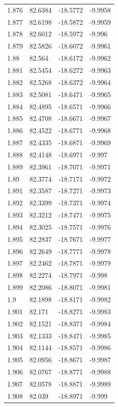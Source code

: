 \begin{tabular}{llll}
1.876 & 82.6384 & -18.5772 & -9.9958 \\
1.877 & 82.6198 & -18.5872 & -9.9959 \\
1.878 & 82.6012 & -18.5972 & -9.996 \\
1.879 & 82.5826 & -18.6072 & -9.9961 \\
1.88 & 82.564 & -18.6172 & -9.9962 \\
1.881 & 82.5454 & -18.6272 & -9.9963 \\
1.882 & 82.5268 & -18.6372 & -9.9964 \\
1.883 & 82.5081 & -18.6471 & -9.9965 \\
1.884 & 82.4895 & -18.6571 & -9.9966 \\
1.885 & 82.4708 & -18.6671 & -9.9967 \\
1.886 & 82.4522 & -18.6771 & -9.9968 \\
1.887 & 82.4335 & -18.6871 & -9.9969 \\
1.888 & 82.4148 & -18.6971 & -9.997 \\
1.889 & 82.3961 & -18.7071 & -9.9971 \\
1.89 & 82.3774 & -18.7171 & -9.9972 \\
1.891 & 82.3587 & -18.7271 & -9.9973 \\
1.892 & 82.3399 & -18.7371 & -9.9974 \\
1.893 & 82.3212 & -18.7471 & -9.9975 \\
1.894 & 82.3025 & -18.7571 & -9.9976 \\
1.895 & 82.2837 & -18.7671 & -9.9977 \\
1.896 & 82.2649 & -18.7771 & -9.9978 \\
1.897 & 82.2462 & -18.7871 & -9.9979 \\
1.898 & 82.2274 & -18.7971 & -9.998 \\
1.899 & 82.2086 & -18.8071 & -9.9981 \\
1.9 & 82.1898 & -18.8171 & -9.9982 \\
1.901 & 82.171 & -18.8271 & -9.9983 \\
1.902 & 82.1521 & -18.8371 & -9.9984 \\
1.903 & 82.1333 & -18.8471 & -9.9985 \\
1.904 & 82.1144 & -18.8571 & -9.9986 \\
1.905 & 82.0956 & -18.8671 & -9.9987 \\
1.906 & 82.0767 & -18.8771 & -9.9988 \\
1.907 & 82.0578 & -18.8871 & -9.9989 \\
1.908 & 82.039 & -18.8971 & -9.999 \\

\end{tabular}
